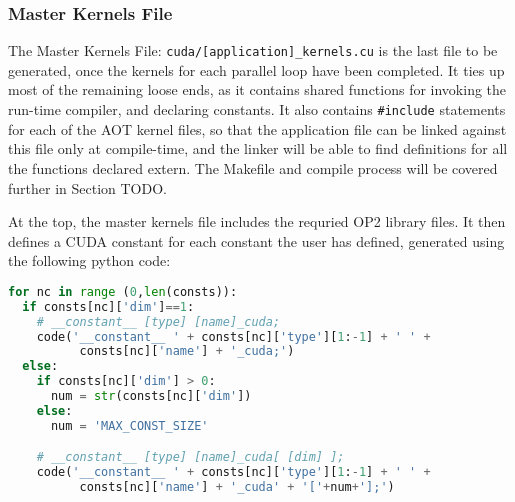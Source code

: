 \subsubsection{Master Kernels File}
\label{sss:mkf}
The Master Kernels File: \verb|cuda/[application]_kernels.cu| is the last file to be generated, once the kernels for each parallel loop have been completed. It ties up most of the remaining loose ends, as it contains shared functions for invoking the run-time compiler, and declaring constants. It also contains \verb|#include| statements for each of the AOT kernel files, so that the application file can be linked against this file only at compile-time, and the linker will be able to find definitions for all the functions declared extern. The Makefile and compile process will be covered further in Section TODO.
\par
At the top, the master kernels file includes the requried OP2 library files. It then defines a CUDA constant for each constant the user has defined, generated using the following python code:
\begin{lstlisting}[backgroundcolor = \color{lightgray!20}, language=Python]
for nc in range (0,len(consts)):
  if consts[nc]['dim']==1:
    # __constant__ [type] [name]_cuda;
    code('__constant__ ' + consts[nc]['type'][1:-1] + ' ' +
          consts[nc]['name'] + '_cuda;')
  else:
    if consts[nc]['dim'] > 0:
      num = str(consts[nc]['dim'])
    else:
      num = 'MAX_CONST_SIZE'

    # __constant__ [type] [name]_cuda[ [dim] ];
    code('__constant__ ' + consts[nc]['type'][1:-1] + ' ' +
          consts[nc]['name'] + '_cuda' + '['+num+'];')
\end{lstlisting}
\vspace{-1em}
